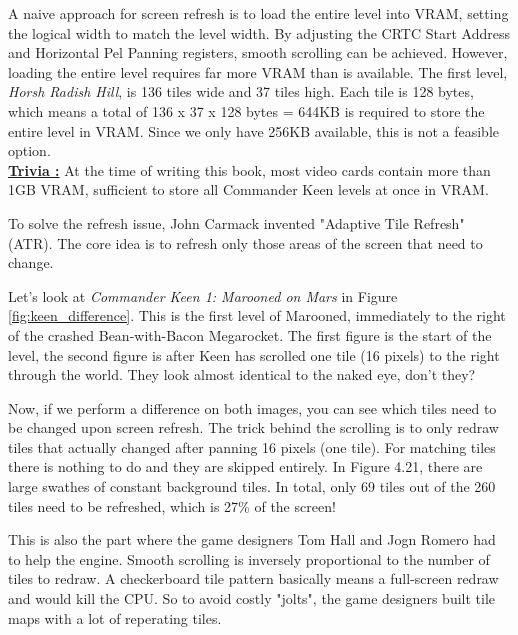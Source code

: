 \documentclass[book.tex]{subfiles}
\begin{document}
\par
A naive approach for screen refresh is to load the entire level into VRAM, setting the logical width to match the level width. By adjusting the CRTC Start Address and Horizontal Pel Panning registers, smooth scrolling can be achieved. However, loading the entire level requires far more VRAM than is available. The first level, \textit{Horsh Radish Hill}, is 136 tiles wide and 37 tiles high. Each tile is 128 bytes,  which means a total of 136 x 37 x 128 bytes = 644KB is required to store the entire level in VRAM. Since we only have 256KB available, this is not a feasible option.\\

\textbf{\underline{Trivia :}} At the time of writing this book, most video cards contain more than 1GB VRAM,  sufficient to store all Commander Keen levels at once in VRAM. \\

\par
To solve the refresh issue, John Carmack invented "Adaptive Tile Refresh" (ATR). The core idea is to refresh only those areas of the screen that need to change. \\

\par
Let's look at \textit{Commander Keen 1: Marooned on Mars} in Figure \ref{fig:keen_difference}. This is the first level of Marooned, immediately to the right of the crashed Bean-with-Bacon Megarocket. The first figure is the start of the level, the second figure is after Keen has scrolled one tile (16 pixels) to the right through the world. They look almost identical to the naked eye, don't they? \\

\par
Now, if we perform a difference on both images, you can see which tiles need to be changed upon screen refresh. The trick behind the scrolling is to only redraw tiles that actually changed after panning 16 pixels (one tile). For matching tiles there is nothing to do and they are skipped entirely. In Figure 4.21, there are large swathes of constant background tiles. In total, only 69 tiles out of the 260 tiles need to be refreshed, which is 27\% of the screen!\\

\par
This is also the part where the game designers Tom Hall and Jogn Romero had to help the engine. Smooth scrolling is inversely proportional to the number of tiles to redraw. A checkerboard tile pattern basically means a full-screen redraw and would kill the CPU. So to avoid costly "jolts", the game designers built tile maps with a lot of reperating tiles. \\
\end{document}
